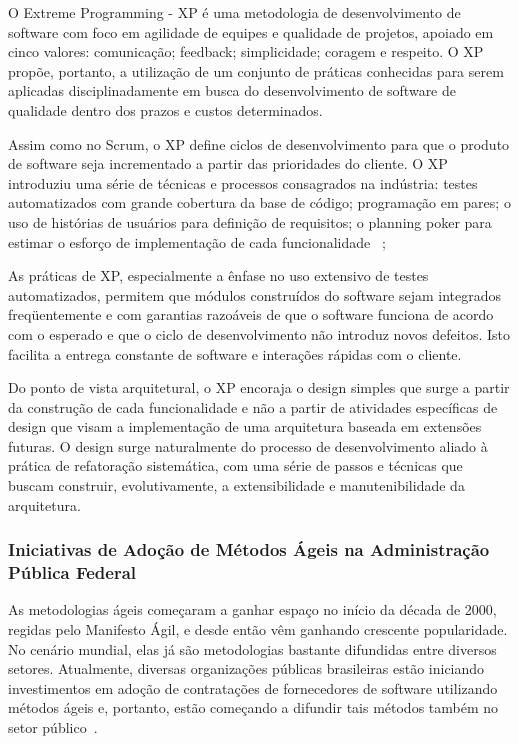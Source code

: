 O Extreme Programming - XP é uma metodologia de desenvolvimento de software com
foco em agilidade de equipes e qualidade de projetos, apoiado em cinco valores:
comunicação; feedback; simplicidade; coragem e respeito. O XP propõe, portanto,
a utilização de um conjunto de práticas conhecidas para serem aplicadas
disciplinadamente em busca do desenvolvimento de software de qualidade dentro
dos prazos e custos determinados.  

Assim como no Scrum, o XP define ciclos de desenvolvimento para que o produto de software seja incrementado a partir das prioridades do cliente. O XP introduziu uma série de técnicas e processos consagrados na indústria: testes automatizados com grande cobertura da base de código; programação em pares; o uso de histórias de usuários para definição de requisitos; o planning poker para estimar o esforço de implementação de cada funcionalidade ~\cite{cohn2005}; 

As práticas de XP, especialmente a ênfase no uso extensivo de testes automatizados, permitem que módulos construídos do software sejam integrados freqüentemente e com garantias razoáveis de que o software funciona de acordo com o esperado e que o ciclo de desenvolvimento não introduz novos defeitos. Isto facilita a entrega constante de software e interações rápidas com o cliente.

Do ponto de vista arquitetural, o XP encoraja o design simples que surge a partir da construção de cada funcionalidade e não a partir de atividades específicas de design que visam a implementação de uma arquitetura baseada em extensões futuras. O design surge naturalmente do processo de desenvolvimento aliado à prática de refatoração sistemática, com uma série de passos e técnicas que buscam construir, evolutivamente, a extensibilidade e manutenibilidade da arquitetura. 

\subsubsection{Iniciativas de Adoção de Métodos Ágeis na Administração Pública Federal}

As metodologias ágeis começaram a ganhar espaço no início da década de 2000,
regidas pelo Manifesto Ágil, e desde então vêm ganhando crescente popularidade.
No cenário mundial, elas já são metodologias bastante difundidas entre diversos
setores. Atualmente, diversas organizações públicas brasileiras estão iniciando
investimentos em adoção de contratações de fornecedores de software utilizando
métodos ágeis e, portanto, estão começando a difundir tais métodos também no
setor público~\cite{melo2012}.

